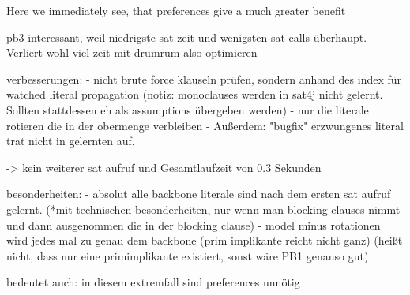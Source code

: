 Here we immediately see, that preferences give a much greater benefit 

pb3 interessant, weil niedrigste sat zeit und wenigsten sat calls überhaupt. Verliert wohl viel zeit mit drumrum also optimieren

verbesserungen:
- nicht brute force klauseln prüfen, sondern anhand des index für watched literal propagation (notiz: monoclauses werden in sat4j nicht gelernt. Sollten stattdessen eh als assumptions übergeben werden)
- nur die literale rotieren die in der obermenge verbleiben
- Außerdem: "bugfix" erzwungenes literal trat nicht in gelernten auf.

-> kein weiterer sat aufruf und Gesamtlaufzeit von 0.3 Sekunden

besonderheiten: 
- absolut alle backbone literale sind nach dem ersten sat aufruf gelernt. (*mit technischen besonderheiten, nur wenn man blocking clauses nimmt und dann ausgenommen die in der blocking clause)
- model minus rotationen wird jedes mal zu genau dem backbone (prim implikante reicht nicht ganz) (heißt nicht, dass nur eine primimplikante existiert, sonst wäre PB1 genauso gut)

bedeutet auch: in diesem extremfall sind preferences unnötig

